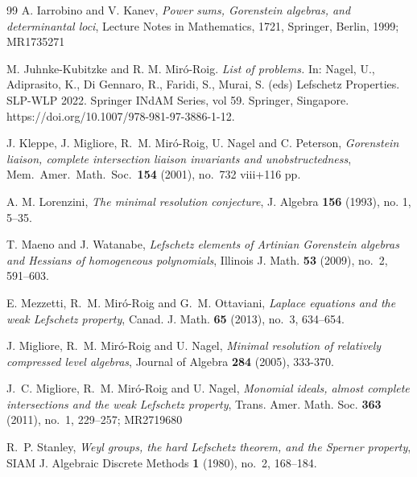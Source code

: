 \documentclass[12pt,twoside]{amsart}
\numberwithin{equation}{section} \hyphenation{semi-stable}
\theoremstyle{definition}
\begin{document}
\begin{thebibliography}{99}
A. Iarrobino and V. Kanev, {\it Power sums, Gorenstein algebras, and determinantal loci}, Lecture Notes in Mathematics, 1721, Springer, Berlin, 1999; MR1735271


M. Juhnke-Kubitzke and R. M. Miró-Roig. {\em List of problems. } In: Nagel, U., Adiprasito,
K., Di Gennaro, R., Faridi, S., Murai, S. (eds) Lefschetz Properties. SLP-WLP 2022. Springer INdAM
Series, vol 59. Springer, Singapore. https://doi.org/10.1007/978-981-97-3886-1-12.

J. Kleppe, J.  Migliore, R.~M.  Mir\' o-Roig, U. Nagel and  C. Peterson, {\em Gorenstein liaison, complete intersection
liaison invariants and unobstructedness}, Mem.\ Amer.\ Math.\
  Soc.\ {\bf 154} (2001), no.\ 732 viii+116 pp.



  A. M. Lorenzini, {\em The minimal resolution conjecture}, J. Algebra {\bf 156} (1993), no. 1, 5--35.

  
T. Maeno and J. Watanabe, {\em Lefschetz elements of Artinian Gorenstein algebras and Hessians of homogeneous polynomials}, Illinois J. Math. {\bf 53} (2009), no.~2, 591--603. 



E. Mezzetti, R.~M. Mir\'o-Roig and G.~M. Ottaviani, {\em Laplace equations and the weak Lefschetz property}, Canad. J. Math. {\bf 65} (2013), no.~3, 634--654. 

  J.  Migliore, R.~M.  Mir\' o-Roig and U. Nagel, {\em Minimal resolution of relatively compressed level algebras}, Journal of Algebra
{\bf 284} (2005),  333-370.

 J.~C. Migliore, R.~M. Mir\'o-Roig and U. Nagel, {\em Monomial ideals, almost complete intersections and the weak Lefschetz property}, Trans. Amer. Math. Soc. {\bf 363} (2011), no.~1, 229--257; MR2719680




R.~P. Stanley, {\em Weyl groups, the hard Lefschetz theorem, and the Sperner property}, SIAM J. Algebraic Discrete Methods {\bf 1} (1980), no.~2, 168--184.

\end{thebibliography}
\end{document}
